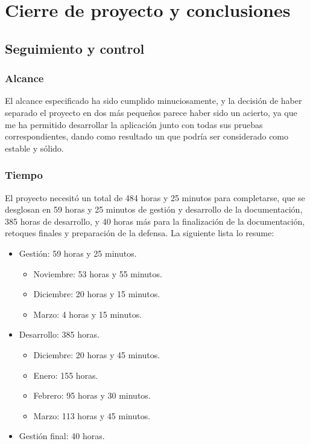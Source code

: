 \chapter{Cierre de proyecto y conclusiones}
\section{Seguimiento y control}
\subsection{Alcance}
El alcance especificado ha sido cumplido minuciosamente, y la decisión de haber
separado el proyecto en dos más pequeños parece haber sido un acierto, ya que
me ha permitido desarrollar la aplicación junto con todas sus pruebas
correspondientes, dando como resultado un  que podría
ser considerado como estable y sólido.

\subsection{Tiempo}
\label{sec:syc:time}
El proyecto necesitó un total de 484 horas y 25 minutos para completarse, que
se desglosan en 59 horas y 25 minutos de gestión y desarrollo de la
documentación, 385 horas de desarrollo, y 40 horas más para la finalización de
la documentación, retoques finales y preparación de la defensa. La siguiente
lista lo resume:

\begin{itemize}
    \item Gestión: 59 horas y 25 minutos.
    \begin{itemize}
        \item Noviembre: 53 horas y 55 minutos.
        \item Diciembre: 20 horas y 15 minutos.
        \item Marzo: 4 horas y 15 minutos.
    \end{itemize}
    \item Desarrollo: 385 horas.
    \begin{itemize}
        \item Diciembre: 20 horas y 45 minutos.
        \item Enero: 155 horas.
        \item Febrero: 95 horas y 30 minutos.
        \item Marzo: 113 horas y 45 minutos.
    \end{itemize}
    \item Gestión final: 40 horas.
\end{itemize}

